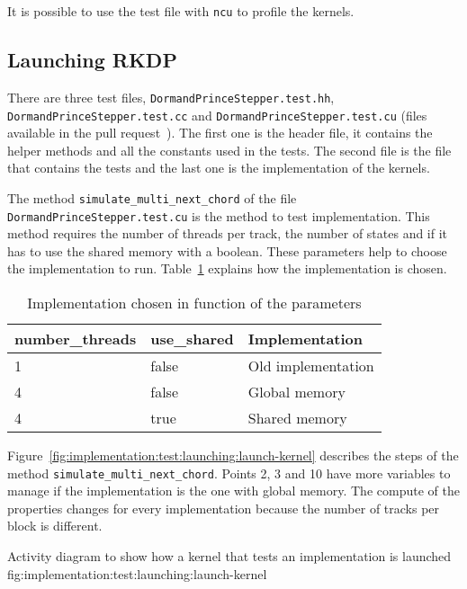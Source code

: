 It is possible to use the test file with \texttt{ncu} to profile the kernels.

\subsection{Launching RKDP}
\label{ch:implementation:test:launching}

There are three test files, \texttt{DormandPrinceStepper.test.hh},
\texttt{DormandPrinceStepper.test.cc} and \texttt{DormandPrinceStepper.test.cu}
(files available in the pull request~\cite{pull-request-barras}).
The first one is the header file, it contains the helper methods and all the
constants used in the tests.
The second file is the file that contains the tests and the last one is the
implementation of the kernels.

The method \texttt{simulate\_multi\_next\_chord} of the file
\texttt{DormandPrinceStepper.test.cu} is the method to test implementation.
This method requires the number of threads per track, the number of states and if
it has to use the shared memory with a boolean.
These parameters help to choose the implementation to run.
Table~\ref{tab:implementation:test:launching:implementation} explains how the
implementation is chosen.

\begin{table}[ht]
    \centering
    \begin{tabular}{|l|l|l|}
        \hline
        \textbf{number\_threads} & \textbf{use\_shared} & \textbf{Implementation} \\
        \hline
        1 & false & Old implementation \\
        \hline
        4 & false & Global memory \\
        \hline
        4 & true & Shared memory \\
        \hline
    \end{tabular}
    \caption{Implementation chosen in function of the parameters}
    \label{tab:implementation:test:launching:implementation}
\end{table}

Figure~\ref{fig:implementation:test:launching:launch-kernel} describes the steps
of the method \texttt{simulate\_multi\_next\_chord}.
Points 2, 3 and 10 have more variables to manage if the implementation is the
one with global memory.
The compute of the properties changes for every implementation because the
number of tracks per block is different.

{Activity diagram to show how a kernel that tests an implementation is launched}
{fig:implementation:test:launching:launch-kernel}

